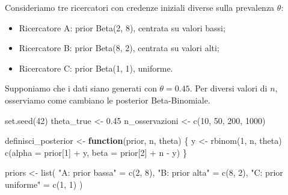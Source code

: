 \documentclass[
  italian,
  letterpaper,
  a4paper,
  11pt,
  open=any]{scrbook}
\newenvironment{Shaded}{\begin{snugshade}}{\end{snugshade}}
\newcommand{\AttributeTok}[1]{\textcolor[rgb]{0.40,0.45,0.13}{#1}}
\newcommand{\ControlFlowTok}[1]{\textcolor[rgb]{0.00,0.23,0.31}{\textbf{#1}}}
\newcommand{\DecValTok}[1]{\textcolor[rgb]{0.68,0.00,0.00}{#1}}
\newcommand{\FloatTok}[1]{\textcolor[rgb]{0.68,0.00,0.00}{#1}}
\newcommand{\FunctionTok}[1]{\textcolor[rgb]{0.28,0.35,0.67}{#1}}
\newcommand{\NormalTok}[1]{\textcolor[rgb]{0.00,0.23,0.31}{#1}}
\newcommand{\OtherTok}[1]{\textcolor[rgb]{0.00,0.23,0.31}{#1}}
\newcommand{\SpecialCharTok}[1]{\textcolor[rgb]{0.37,0.37,0.37}{#1}}
\newcommand{\StringTok}[1]{\textcolor[rgb]{0.13,0.47,0.30}{#1}}
\providecommand{\tightlist}{%
  \setlength{\itemsep}{0pt}\setlength{\parskip}{0pt}}
\theoremstyle{plain}
\theoremstyle{definition}
\theoremstyle{definition}
\theoremstyle{remark}
\begin{document}
Consideriamo tre ricercatori con credenze iniziali diverse sulla
prevalenza \(\theta\):

\begin{itemize}
\tightlist
\item
  Ricercatore A: prior Beta(2, 8), centrata su valori bassi;
\item
  Ricercatore B: prior Beta(8, 2), centrata su valori alti;
\item
  Ricercatore C: prior Beta(1, 1), uniforme.
\end{itemize}

Supponiamo che i dati siano generati con \(\theta = 0.45\). Per diversi
valori di \(n\), osserviamo come cambiano le posterior Beta-Binomiale.

\begin{Shaded}
\begin{Highlighting}[]
\FunctionTok{set.seed}\NormalTok{(}\DecValTok{42}\NormalTok{)}
\NormalTok{theta\_true }\OtherTok{\textless{}{-}} \FloatTok{0.45}
\NormalTok{n\_osservazioni }\OtherTok{\textless{}{-}} \FunctionTok{c}\NormalTok{(}\DecValTok{10}\NormalTok{, }\DecValTok{50}\NormalTok{, }\DecValTok{200}\NormalTok{, }\DecValTok{1000}\NormalTok{)}

\NormalTok{definisci\_posterior }\OtherTok{\textless{}{-}} \ControlFlowTok{function}\NormalTok{(prior, n, theta) \{}
\NormalTok{  y }\OtherTok{\textless{}{-}} \FunctionTok{rbinom}\NormalTok{(}\DecValTok{1}\NormalTok{, n, theta)}
  \FunctionTok{c}\NormalTok{(}\AttributeTok{alpha =}\NormalTok{ prior[}\DecValTok{1}\NormalTok{] }\SpecialCharTok{+}\NormalTok{ y, }\AttributeTok{beta =}\NormalTok{ prior[}\DecValTok{2}\NormalTok{] }\SpecialCharTok{+}\NormalTok{ n }\SpecialCharTok{{-}}\NormalTok{ y)}
\NormalTok{\}}

\NormalTok{priors }\OtherTok{\textless{}{-}} \FunctionTok{list}\NormalTok{(}
  \StringTok{"A: prior bassa"} \OtherTok{=} \FunctionTok{c}\NormalTok{(}\DecValTok{2}\NormalTok{, }\DecValTok{8}\NormalTok{),}
  \StringTok{"B: prior alta"} \OtherTok{=} \FunctionTok{c}\NormalTok{(}\DecValTok{8}\NormalTok{, }\DecValTok{2}\NormalTok{),}
  \StringTok{"C: prior uniforme"} \OtherTok{=} \FunctionTok{c}\NormalTok{(}\DecValTok{1}\NormalTok{, }\DecValTok{1}\NormalTok{)}
\NormalTok{)}


\end{Highlighting}
\end{Shaded}
\end{document}
